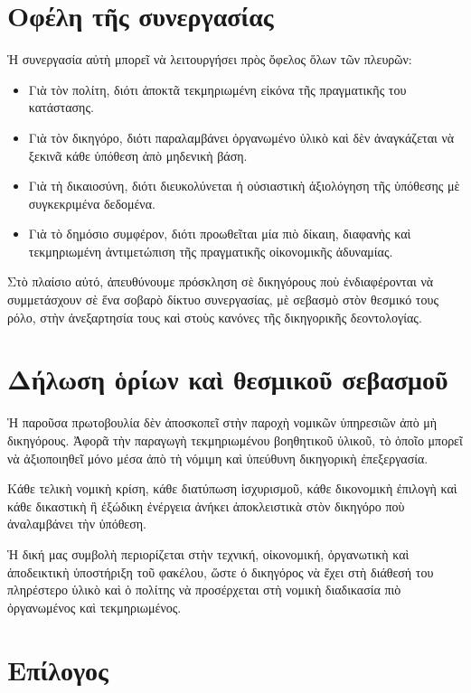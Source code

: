 \documentclass[12pt,a4paper]{article}
\begin{document}
\section{Οφέλη τῆς συνεργασίας} 

Ἡ συνεργασία αὐτὴ μπορεῖ νὰ λειτουργήσει πρὸς ὄφελος ὅλων τῶν πλευρῶν: 

\begin{itemize} 
	\item Γιὰ τὸν πολίτη, διότι ἀποκτᾶ τεκμηριωμένη εἰκόνα τῆς πραγματικῆς του κατάστασης. 
	\item Γιὰ τὸν δικηγόρο, διότι παραλαμβάνει ὀργανωμένο ὑλικὸ καὶ δὲν ἀναγκάζεται νὰ ξεκινᾶ κάθε ὑπόθεση ἀπὸ μηδενικὴ βάση. 
	\item Γιὰ τὴ δικαιοσύνη, διότι διευκολύνεται ἡ οὐσιαστικὴ ἀξιολόγηση τῆς ὑπόθεσης μὲ συγκεκριμένα δεδομένα. 
	\item Γιὰ τὸ δημόσιο συμφέρον, διότι προωθεῖται μία πιὸ δίκαιη, διαφανὴς καὶ τεκμηριωμένη ἀντιμετώπιση τῆς πραγματικῆς οἰκονομικῆς ἀδυναμίας. 
\end{itemize} 

Στὸ πλαίσιο αὐτό, ἀπευθύνουμε πρόσκληση σὲ δικηγόρους ποὺ ἐνδιαφέρονται νὰ συμμετάσχουν σὲ ἕνα σοβαρὸ δίκτυο συνεργασίας, μὲ σεβασμὸ στὸν θεσμικό τους ρόλο, στὴν ἀνεξαρτησία τους καὶ στοὺς κανόνες τῆς δικηγορικῆς δεοντολογίας. 

\section{Δήλωση ὁρίων καὶ θεσμικοῦ σεβασμοῦ} 

Ἡ παροῦσα πρωτοβουλία δὲν ἀποσκοπεῖ στὴν παροχὴ νομικῶν ὑπηρεσιῶν ἀπὸ μὴ δικηγόρους. Ἀφορᾶ τὴν παραγωγὴ τεκμηριωμένου βοηθητικοῦ ὑλικοῦ, τὸ ὁποῖο μπορεῖ νὰ ἀξιοποιηθεῖ μόνο μέσα ἀπὸ τὴ νόμιμη καὶ ὑπεύθυνη δικηγορικὴ ἐπεξεργασία. 

Κάθε τελικὴ νομικὴ κρίση, κάθε διατύπωση ἰσχυρισμοῦ, κάθε δικονομικὴ ἐπιλογὴ καὶ κάθε δικαστικὴ ἢ ἐξώδικη ἐνέργεια ἀνήκει ἀποκλειστικὰ στὸν δικηγόρο ποὺ ἀναλαμβάνει τὴν ὑπόθεση. 

Ἡ δική μας συμβολὴ περιορίζεται στὴν τεχνική, οἰκονομική, ὀργανωτικὴ καὶ ἀποδεικτικὴ ὑποστήριξη τοῦ φακέλου, ὥστε ὁ δικηγόρος νὰ ἔχει στὴ διάθεσή του πληρέστερο ὑλικὸ καὶ ὁ πολίτης νὰ προσέρχεται στὴ νομικὴ διαδικασία πιὸ ὀργανωμένος καὶ τεκμηριωμένος. 

\section{Επίλογος} 
\end{document}
